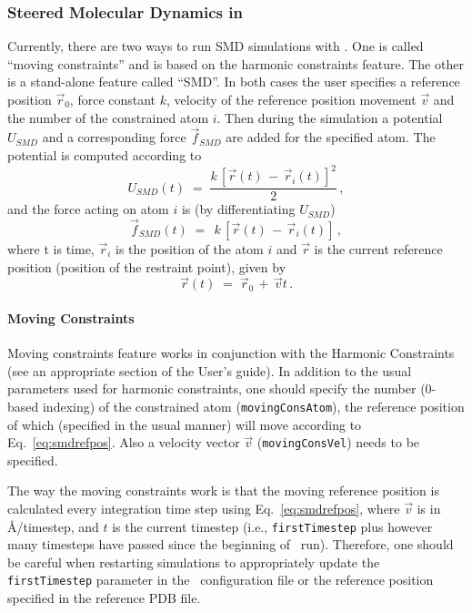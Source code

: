 \subsubsection{Steered Molecular Dynamics in \NAMD}

Currently, there are two ways to run SMD simulations with \NAMD. One
is called ``moving constraints'' and is based on the harmonic
constraints feature. The other is a stand-alone feature called
``SMD''. In both cases the user specifies a reference position 
$\vec r_0$, force constant $k$, velocity of the reference position
movement $\vec v$ and the number of the constrained atom $i$. Then
during the simulation a potential $U_{SMD}$ and a corresponding force
$\vec f_{SMD}$ are added for the specified atom. 
The potential is computed according to
\begin{equation}
   U_{SMD}(t) \; = \; \frac{k \, [\vec r(t) \, - \, \vec r_i(t)]^2}{2} \, ,
\end{equation}
and the force acting on atom $i$ is (by differentiating $U_{SMD}$) 
\begin{equation}
   \vec f_{SMD}(t) \; = \; \, k \, [\vec r(t) \, - \, \vec r_i(t)] \, ,
\label{eq:smdforce}
\end{equation}
where t is time, $\vec r_i$ is the position of the atom $i$ and 
$\vec r$ is the current reference position (position of the restraint
point), given by 
\begin{equation}
   \vec r(t) \; = \; \vec r_0 \, + \, \vec v t \,.
\label{eq:smdrefpos}
\end{equation}

\paragraph{Moving Constraints}

Moving constraints feature works in conjunction with the Harmonic
Constraints (see an appropriate section of the User's guide).  In
addition to the usual parameters used for harmonic constraints, one
should specify the number (0-based indexing) of the constrained atom
({\tt movingConsAtom}), the reference position of which (specified in
the usual manner) will move according to Eq.~\ref{eq:smdrefpos}. Also
a velocity vector $\vec v$ ({\tt movingConsVel}) needs to be specified.

The way the moving constraints work is that the moving reference
position is calculated every integration time step using
Eq.~\ref{eq:smdrefpos}, where $\vec v$ is in \AA/timestep, and $t$ is the
current timestep (i.e., {\tt firstTimestep} plus however many
timesteps have passed since the beginning of \NAMD\ run). Therefore,
one should be careful when restarting simulations to appropriately
update the {\tt firstTimestep} parameter in the \NAMD\ configuration
file or the reference position specified in the reference PDB file.

